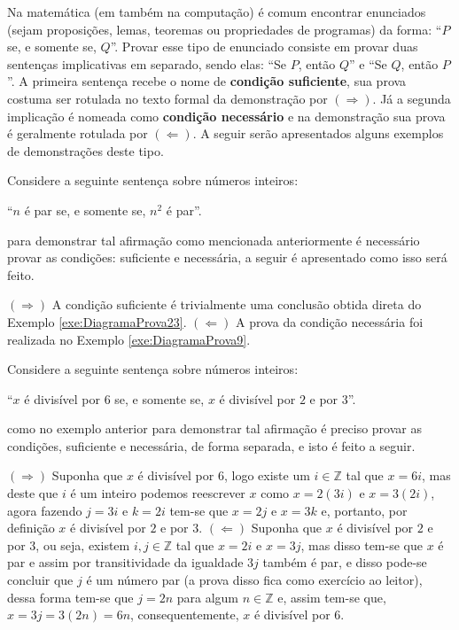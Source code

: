 Na matemática (em também na computação) é comum encontrar enunciados (sejam proposições, lemas, teoremas ou propriedades de programas) da forma: ``$P$ se, e somente se, $Q$''. Provar esse tipo de enunciado consiste em  provar duas sentenças implicativas em separado, sendo elas: ``Se $P$, então $Q$'' e ``Se $Q$, então $P$''.  A primeira sentença recebe o nome de \textbf{condição suficiente}, sua prova costuma ser rotulada no texto formal da demonstração por $(\Rightarrow)$. Já a segunda implicação é nomeada como \textbf{condição necessário} e na demonstração sua prova é geralmente rotulada por $(\Leftarrow)$. A seguir serão apresentados alguns exemplos de demonstrações deste tipo.

\begin{exemplo}\label{exe:ProvaIff1}
	Considere a seguinte sentença sobre números inteiros:
	\begin{center}
		``$n$ é par se, e somente se, $n^2$ é par''.
	\end{center}
	para demonstrar tal afirmação como mencionada anteriormente é necessário provar as condições: suficiente e necessária, a seguir é apresentado como isso será feito.
\end{exemplo}

\begin{prova}
	$(\Rightarrow)$ A condição suficiente é trivialmente uma conclusão obtida direta do Exemplo \ref{exe:DiagramaProva23}. $(\Leftarrow)$ A prova da condição necessária foi realizada no Exemplo \ref{exe:DiagramaProva9}.
\end{prova}

\begin{exemplo}\label{exe:ProvaIff2}
	Considere a seguinte sentença sobre números inteiros:
	\begin{center}
		``$x$ é divisível por $6$ se, e somente se, $x$ é divisível por $2$ e por $3$''.
	\end{center}
	como no exemplo anterior para demonstrar tal afirmação é preciso provar as condições, suficiente e necessária, de forma separada, e isto é feito a seguir.
\end{exemplo}

\begin{prova}
		$(\Rightarrow)$ Suponha que $x$ é divisível por $6$, logo existe um $i \in \mathbb{Z}$ tal que $x = 6i$, mas deste que $i$ é um inteiro podemos reescrever $x$ como $x = 2(3i)$ e $x = 3(2i)$, agora fazendo $j = 3i$ e $k = 2i$ tem-se que $x = 2j$ e $x = 3k$ e, portanto, por definição $x$ é divisível por $2$ e por $3$. $(\Leftarrow)$ Suponha que $x$ é divisível por $2$ e por $3$, ou seja, existem $i, j \in \mathbb{Z}$ tal que $x = 2i$ e $x = 3j$, mas disso tem-se que $x$ é par e assim por transitividade da igualdade $3j$ também é par, e disso pode-se concluir que $j$ é um número par (a prova disso fica como exercício ao leitor), dessa forma tem-se que $j = 2n$ para algum $n \in \mathbb{Z}$ e, assim tem-se que, $x = 3j = 3(2n) = 6n$, consequentemente, $x$ é divisível por $6$.
\end{prova}


